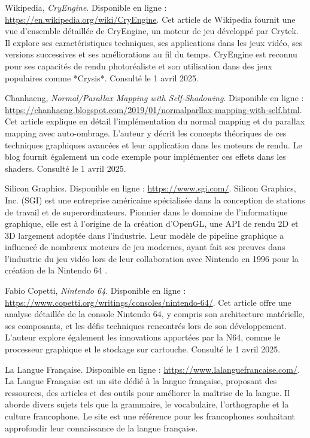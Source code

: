 \begin{thebibliography}{9}
    Wikipedia, \textit{CryEngine}.  
    Disponible en ligne : \url{https://en.wikipedia.org/wiki/CryEngine}.  
    Cet article de Wikipedia fournit une vue d'ensemble détaillée de CryEngine, un moteur de jeu développé par Crytek.  
    Il explore ses caractéristiques techniques, ses applications dans les jeux vidéo, ses versions successives et ses améliorations au fil du temps.  
    CryEngine est reconnu pour ses capacités de rendu photoréaliste et son utilisation dans des jeux populaires comme *Crysis*.  
    Consulté le 1 avril 2025.

    Chanhaeng, \textit{Normal/Parallax Mapping with Self-Shadowing}.  
    Disponible en ligne : \url{https://chanhaeng.blogspot.com/2019/01/normalparllax-mapping-with-self.html}.  
    Cet article explique en détail l'implémentation du normal mapping et du parallax mapping avec auto-ombrage.  
    L'auteur y décrit les concepts théoriques de ces techniques graphiques avancées et leur application dans les moteurs de rendu.  
    Le blog fournit également un code exemple pour implémenter ces effets dans les shaders.  
    Consulté le 1 avril 2025.

    Silicon Graphics.
    Disponible en ligne : \url{https://www.sgi.com/}.
    Silicon Graphics, Inc. (SGI) est une entreprise américaine spécialisée dans la conception de stations de travail et de superordinateurs.
    Pionnier dans le domaine de l'informatique graphique, elle est à l'origine de la création d'OpenGL,
    une API de rendu 2D et 3D largement adoptée dans l'industrie. Leur modèle de pipeline graphique a influencé
    de nombreux moteurs de jeu modernes, ayant fait ses preuves dans l'industrie du jeu vidéo lors de leur collaboration avec
    Nintendo en 1996 pour la création de la Nintendo 64 \cite{copetti_n64}.

    Fabio Copetti, \textit{Nintendo 64}.  
    Disponible en ligne : \url{https://www.copetti.org/writings/consoles/nintendo-64/}.  
    Cet article offre une analyse détaillée de la console Nintendo 64, y compris son architecture matérielle, ses composants, et les défis techniques rencontrés lors de son développement.  
    L'auteur explore également les innovations apportées par la N64, comme le processeur graphique et le stockage sur cartouche.  
    Consulté le 1 avril 2025.

    La Langue Française.
    Disponible en ligne : \url{https://www.lalanguefrancaise.com/}.
    La Langue Française est un site dédié à la langue française, proposant des ressources, des articles et des outils pour améliorer la maîtrise de la langue.
    Il aborde divers sujets tels que la grammaire, le vocabulaire, l'orthographe et la culture francophone.
    Le site est une référence pour les francophones souhaitant approfondir leur connaissance de la langue française.


\end{thebibliography}
